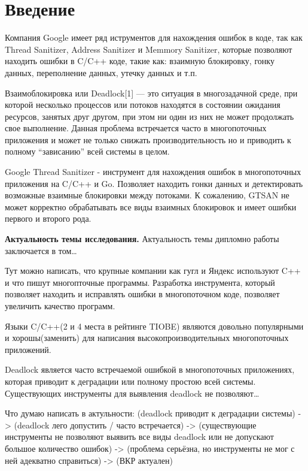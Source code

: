 
\section*{Введение}

Компания Google имеет ряд иструментов для нахождения ошибок в коде, так как Thread Sanitizer, Address Sanitizer и Memmory Sanitizer, которые позволяют находить ошибки в C/C++ коде, такие как: взаимную блокировку, гонку данных, переполнение данных, утечку данных и т.п. 

Взаимоблокировка или Deadlock[1] — это ситуация в многозадачной среде, при которой несколько процессов или потоков находятся в состоянии ожидания ресурсов, занятых друг другом, при этом ни один из них не может продолжать свое выполнение. Данная проблема встречается часто в многопоточных приложения и может не только снижать производительность но и приводить к полному “зависанию” всей системы в целом.

Google Thread Sanitizer - инструмент для нахождения ошибок в многопоточных приложения на C/C++ и Go. Позволяет находить гонки данных и детектировать возможные взаимные блокировки между потоками. К сожалению, GTSAN не может корректно обрабатывать все виды взаимных блокировок и имеет ошибки первого и второго рода.

\textbf{Актуальность темы исследования.} Актуальность темы дипломно работы заключается в том\dots

Тут можно написать, что крупные компании как гугл и Яндекс используют C++ и что пишут многопточные программы. Разработка инструмента, который позволяет находить и исправлять ошибки в многопоточном коде, позволяет увеличить качество программ.

Языки C/C++(2 и 4 места в рейтинге TIOBE) являются довольно популярными и хорошы(заменить) для написания высокопроизводительных многопоточных приложений. 

Deadlock является часто встречаемой ошибкой в многопоточных приложениях, которая приводит к деградации или полному простою всей системы. Существующих инструменты для выявления deadlock не позволяют\dots

Что думаю написать в актульности: (deadlock приводит к деградации системы) -> (deadlock лего допустить / часто встречается) -> (существующие инструменты не позволяют выявить все виды deadlock или не допускают большое количество ошибок) -> (проблема серьёзна, но инструменты не мог с ней адекватно справиться) -> (ВКР актуален)

